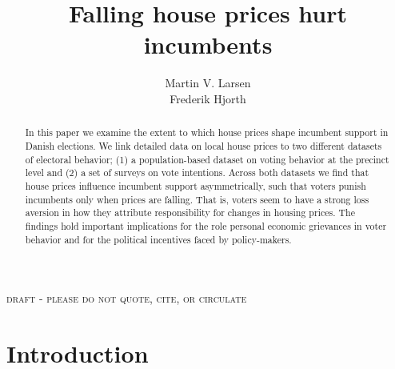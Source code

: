 \documentclass[12pt,a4paper]{article}
\title{ Falling house prices hurt incumbents  }
\author{
Martin V. Larsen \\ Frederik Hjorth}
\begin{document}
\maketitle

\begin{center}
\textsc{draft - please do not quote, cite, or circulate}
\end{center}

\begin{abstract}
\noindent In this paper we examine the extent to which house prices shape incumbent support in Danish elections. We link detailed data on local house prices to two different datasets of electoral behavior;  (1)  a population-based dataset on voting behavior at the precinct level and (2) a set of surveys on vote intentions. Across both datasets we find that house prices influence incumbent support asymmetrically, such that voters punish incumbents only when prices are falling. That is, voters seem to have a strong loss aversion in how they attribute responsibility for changes in housing prices. The findings hold important implications for the role personal economic grievances in voter behavior and for the political incentives faced by policy-makers.
\end{abstract}



\newpage

\onehalfspacing

\section{Introduction}


\clearpage

\singlespacing



\end{document}
